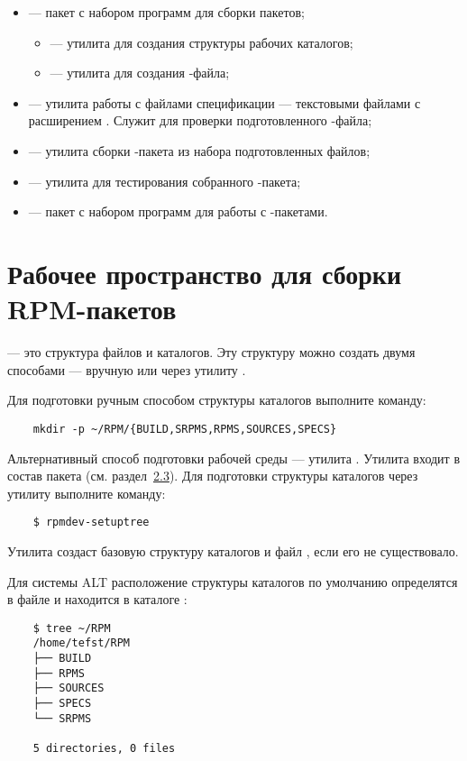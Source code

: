 \begin{itemize}
	\item {} --- пакет с набором программ для сборки пакетов; 
	\begin{itemize}
		\item {} --- утилита для создания структуры рабочих каталогов;
		\item {} --- утилита для создания -файла;
	\end{itemize}
	\item {} --- утилита работы с файлами спецификации --- текстовыми файлами с расширением 
		. Служит для проверки подготовленного -файла;
	\item {} --- утилита сборки -пакета из набора подготовленных файлов;
	\item {} --- утилита для тестирования собранного -пакета;
	\item {} --- пакет с набором программ для работы с -пакетами.
\end{itemize}


\section{Рабочее пространство для сборки RPM-пакетов}
 --- это структура файлов и каталогов. Эту структуру 
можно создать двумя способами --- вручную или через утилиту .

Для подготовки ручным способом структуры каталогов выполните команду:
\begin{verbatim}
	mkdir -p ~/RPM/{BUILD,SRPMS,RPMS,SOURCES,SPECS}
\end{verbatim}

Альтернативный способ подготовки рабочей среды --- утилита . Утилита входит в 
состав пакета  (см. раздел~\hyperlink{1.3}{2.3}). 
Для подготовки структуры каталогов 
через утилиту  выполните команду:
\begin{verbatim}
	$ rpmdev-setuptree
\end{verbatim}

Утилита создаст базовую структуру каталогов и файл , если его не существовало.

Для системы ALT расположение структуры каталогов%
по умолчанию определятся в файле  и находится в каталоге :
\begin{verbatim}
	$ tree ~/RPM
	/home/tefst/RPM
	├── BUILD
	├── RPMS
	├── SOURCES
	├── SPECS
	└── SRPMS
	
	5 directories, 0 files
\end{verbatim}

